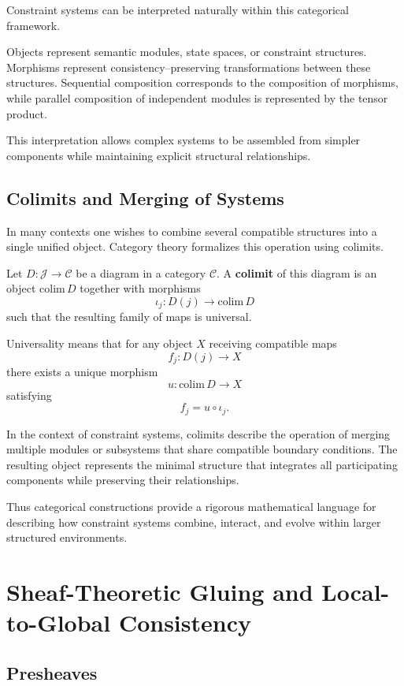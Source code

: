 \documentclass[11pt, openany]{book}
\theoremstyle{plain}
\theoremstyle{definition}
\theoremstyle{remark}
\begin{document}
Constraint systems can be interpreted naturally within this categorical
framework.

Objects represent semantic modules, state spaces, or constraint
structures.  Morphisms represent consistency–preserving transformations
between these structures.  Sequential composition corresponds to the
composition of morphisms, while parallel composition of independent
modules is represented by the tensor product.

This interpretation allows complex systems to be assembled from simpler
components while maintaining explicit structural relationships.

\section{Colimits and Merging of Systems}

In many contexts one wishes to combine several compatible structures
into a single unified object.  Category theory formalizes this operation
using colimits.

Let $D:\mathcal{J}\to\mathcal{C}$ be a diagram in a category
$\mathcal{C}$.  A \textbf{colimit} of this diagram is an object
$\mathrm{colim}\,D$ together with morphisms
\[
\iota_j:D(j)\to \mathrm{colim}\,D
\]
such that the resulting family of maps is universal.

Universality means that for any object $X$ receiving compatible maps
\[
f_j:D(j)\to X
\]
there exists a unique morphism
\[
u:\mathrm{colim}\,D\to X
\]
satisfying
\[
f_j=u\circ\iota_j.
\]

In the context of constraint systems, colimits describe the operation of
merging multiple modules or subsystems that share compatible boundary
conditions.  The resulting object represents the minimal structure that
integrates all participating components while preserving their
relationships.

Thus categorical constructions provide a rigorous mathematical language
for describing how constraint systems combine, interact, and evolve
within larger structured environments.

\chapter{Sheaf-Theoretic Gluing and Local-to-Global Consistency}

\section{Presheaves}
\end{document}
